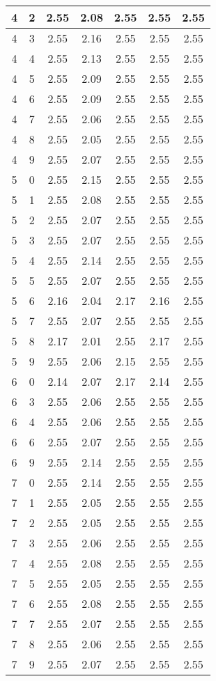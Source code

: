 \begin{longtable}{|c|c||c||c|c||c|c|}
	4 & 2 & 2.55 & 2.08 & 2.55 & 2.55 & 2.55 \\ \hline
	4 & 3 & 2.55 & 2.16 & 2.55 & 2.55 & 2.55 \\ \hline
	4 & 4 & 2.55 & 2.13 & 2.55 & 2.55 & 2.55 \\ \hline
	4 & 5 & 2.55 & 2.09 & 2.55 & 2.55 & 2.55 \\ \hline
	4 & 6 & 2.55 & 2.09 & 2.55 & 2.55 & 2.55 \\ \hline
	4 & 7 & 2.55 & 2.06 & 2.55 & 2.55 & 2.55 \\ \hline
	4 & 8 & 2.55 & 2.05 & 2.55 & 2.55 & 2.55 \\ \hline
	4 & 9 & 2.55 & 2.07 & 2.55 & 2.55 & 2.55 \\ \hline
	5 & 0 & 2.55 & 2.15 & 2.55 & 2.55 & 2.55 \\ \hline
	5 & 1 & 2.55 & 2.08 & 2.55 & 2.55 & 2.55 \\ \hline
	5 & 2 & 2.55 & 2.07 & 2.55 & 2.55 & 2.55 \\ \hline
	5 & 3 & 2.55 & 2.07 & 2.55 & 2.55 & 2.55 \\ \hline
	5 & 4 & 2.55 & 2.14 & 2.55 & 2.55 & 2.55 \\ \hline
	5 & 5 & 2.55 & 2.07 & 2.55 & 2.55 & 2.55 \\ \hline
	5 & 6 & 2.16 & 2.04 & 2.17 & 2.16 & 2.55 \\ \hline
	5 & 7 & 2.55 & 2.07 & 2.55 & 2.55 & 2.55 \\ \hline
	5 & 8 & 2.17 & 2.01 & 2.55 & 2.17 & 2.55 \\ \hline
	5 & 9 & 2.55 & 2.06 & 2.15 & 2.55 & 2.55 \\ \hline
	6 & 0 & 2.14 & 2.07 & 2.17 & 2.14 & 2.55 \\ \hline
	6 & 3 & 2.55 & 2.06 & 2.55 & 2.55 & 2.55 \\ \hline
	6 & 4 & 2.55 & 2.06 & 2.55 & 2.55 & 2.55 \\ \hline
	6 & 6 & 2.55 & 2.07 & 2.55 & 2.55 & 2.55 \\ \hline
	6 & 9 & 2.55 & 2.14 & 2.55 & 2.55 & 2.55 \\ \hline
	7 & 0 & 2.55 & 2.14 & 2.55 & 2.55 & 2.55 \\ \hline
	7 & 1 & 2.55 & 2.05 & 2.55 & 2.55 & 2.55 \\ \hline
	7 & 2 & 2.55 & 2.05 & 2.55 & 2.55 & 2.55 \\ \hline
	7 & 3 & 2.55 & 2.06 & 2.55 & 2.55 & 2.55 \\ \hline
	7 & 4 & 2.55 & 2.08 & 2.55 & 2.55 & 2.55 \\ \hline
	7 & 5 & 2.55 & 2.05 & 2.55 & 2.55 & 2.55 \\ \hline
	7 & 6 & 2.55 & 2.08 & 2.55 & 2.55 & 2.55 \\ \hline
	7 & 7 & 2.55 & 2.07 & 2.55 & 2.55 & 2.55 \\ \hline
	7 & 8 & 2.55 & 2.06 & 2.55 & 2.55 & 2.55 \\ \hline
	7 & 9 & 2.55 & 2.07 & 2.55 & 2.55 & 2.55 \\ \hline
\end{longtable}
